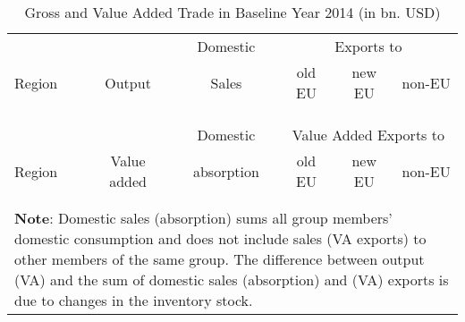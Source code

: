 \documentclass[a4paper,12pt]{article}
\begin{document}
\begin{appendix}
\begin{table}[htp!]\vspace*{-0cm}
 \centering
	\caption{Gross and Value Added Trade in Baseline Year 2014 (in bn. USD)}\label{table_aggexp_base}
	\footnotesize
\hspace*{-0cm}\begin{tabular}{lccccc}
\toprule
& & Domestic & \multicolumn{3}{c}{Exports to}\\
 Region & Output & Sales & old EU &  new EU & non-EU\\
\midrule\\[-.5EM]
\\[-.75EM]
\midrule\\[.25EM]
& & Domestic & \multicolumn{3}{c}{Value Added Exports to}\\
Region & Value added & absorption & old EU &  new EU & non-EU\\
\midrule\\[-.0EM]
\\[-1EM]
\bottomrule
\multicolumn{6}{l}{\parbox[t]{5.7in}{\scriptsize{\textbf{Note}:  Domestic sales (absorption) sums all group members' domestic consumption and does not include sales (VA exports) to other members of the same group. The difference between output (VA) and the sum of domestic sales (absorption) and (VA) exports is due to changes in the inventory stock.}}}
\end{tabular}
\end{table}






\begin{table}[htp!]\vspace*{-0cm}
  \centering
	\caption{Trade Flows and VAX-Ratios in the Baseline Year 2014}\label{table_secbilexp}
\end{table}





\end{appendix}
\end{document}
